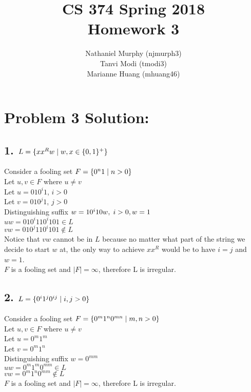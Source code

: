\documentclass[11pt]{article}
\title{\textbf{CS 374 Spring 2018 \\
				Homework 3}}
\author{Nathaniel Murphy (njmurph3) \\
		Tanvi Modi (tmodi3) \\
		Marianne Huang (mhuang46)}
\date{}
\begin{document}
\maketitle

\section*{Problem 3 Solution:}

\subsection*{1. $L = \{xx^Rw\hspace{1mm}|\hspace{1mm}w,x \in \{0, 1\}^+\}$}
\begin{addmargin}[2em]{0em}
Consider a fooling set $F = \{0^n1\hspace{1mm}|\hspace{1mm}n>0\}$ \\
Let $u, v \in F$ where $u \neq v$ \\
Let $u = 010^i1$, $i>0$ \\
Let $v = 010^j1$, $j>0$ \\
Distinguishing suffix $w = 10^i10w,\hspace{1mm}i>0, w=1$ \\
$uw = 010^i110^i101 \in L$ \\
$vw = 010^j110^i101 \notin L$ \\
Notice that $vw$ cannot be in $L$ because no matter what part of the string we decide to start $w$ at, the only way to achieve $xx^R$ would be to have $i=j$ and $w=1$. \\
$F$ is a fooling set and $|F| = \infty$, therefore L is irregular.
\end{addmargin}

\subsection*{2. $L = \{0^i1^j0^{ij}\hspace{1mm}|\hspace{1mm}i,j > 0\}$}
\begin{addmargin}[2em]{0em}
Consider a fooling set $F = \{0^m1^n0^{mn}\hspace{1mm}|\hspace{1mm}m,n > 0\}$ \\
Let $u, v \in F$ where $u \neq v$ \\
Let $u = 0^m1^m$ \\
Let $v = 0^m1^n$ \\
Distinguishing suffix $w = 0^{mm}$ \\
$uw = 0^m1^m0^{mm} \in L$ \\
$vw = 0^m1^n0^{mm} \notin L$ \\
$F$ is a fooling set and $|F| = \infty$, therefore L is irregular.
\end{addmargin}
\end{document}
